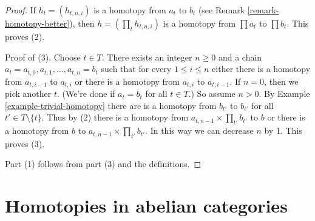 \begin{proof}
If $h_t = (h_{t, n , i})$ is a homotopy from $a_t$ to $b_t$
(see Remark \ref{remark-homotopy-better}), then
$h = (\prod_t h_{t, n, i})$ is a homotopy from $\prod a_t$ to $\prod b_t$.
This proves (2).

\medskip\noindent
Proof of (3). Choose $t \in T$. There exists an integer $n \geq 0$
and a chain $a_t = a_{t, 0}, a_{t, 1}, \ldots, a_{t, n} = b_t$ such that
for every $1 \leq i \leq n$ either there is a homotopy from
$a_{t, i - 1}$ to $a_{t, i}$ or there is a homotopy from
$a_{t, i}$ to $a_{t, i - 1}$. If $n = 0$, then we pick another $t$.
(We're done if $a_t = b_t$ for all $t \in T$.) So assume $n > 0$.
By Example \ref{example-trivial-homotopy}
there are is a homotopy from $b_{t'}$ to $b_{t'}$ for all
$t' \in T \setminus \{t\}$. Thus by (2) there is a homotopy from
$a_{t, n - 1} \times \prod_{t'} b_{t'}$ to $b$ or there is a
homotopy from $b$ to $a_{t, n - 1} \times \prod_{t'} b_{t'}$.
In this way we can decrease $n$ by $1$. This proves (3).

\medskip\noindent
Part (1) follows from part (3) and the definitions.
\end{proof}




\section{Homotopies in abelian categories}
\label{section-homotopy-abelian}

